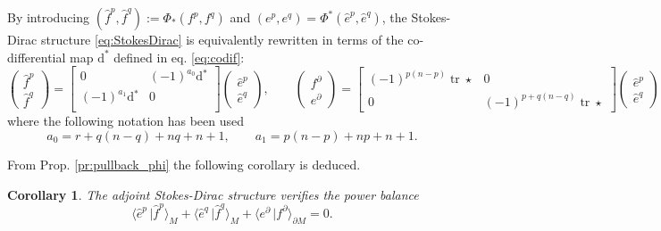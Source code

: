 \documentclass{elsarticle}
\newtheorem{corollary}{Corollary}
\renewcommand\d{\ensuremath{\mathrm{d}}}
\DeclareMathOperator{\tr}{tr}
\newcommand*{\dual}[1]{\ensuremath{\widehat{#1}}}
\newcommand{\dualpr}[3][]{\ensuremath{\langle #2 \, \vert #3 \rangle_{#1}}}
\begin{document}
By introducing $(\dual{f}^{p},\dual{f}^{q}) := \Phi_*(f^p,f^q)$ and $ (e^p,e^q)= \Phi^*(\dual{e}^{p},\dual{e}^{q})$, the Stokes-Dirac structure \eqref{eq:StokesDirac} is equivalently rewritten 
in terms of the co-differential map $\d^*$ defined in eq. \eqref{eq:codif}:
\begin{equation}\label{eq:AdjStokesDirac}
    \begin{pmatrix}
    \dual{f}^{p} \\
    \dual{f}^{q} 
    \end{pmatrix} = 
    \begin{bmatrix}
        0 &  (-1)^{a_0}\d{}^* \\
        (-1)^{a_1}\d{}^* & 0 \\
    \end{bmatrix}
    \begin{pmatrix}
        \dual{e}^{p}\\
        \dual{e}^{q}
    \end{pmatrix}, \qquad 
    \begin{pmatrix}
        {f}^\partial \\
        {e}^\partial
    \end{pmatrix} = 
    \begin{bmatrix}
    (-1)^{p(n-p)} \tr \star & 0 \\
    0 &  (-1)^{p+q(n-q)}\tr \star
    \end{bmatrix}
    \begin{pmatrix}
        \dual{e}^{p}\\
        \dual{e}^{q}
    \end{pmatrix},
\end{equation}
where the following notation has been used
\begin{equation}\label{eq:a_coeff}
    a_0 = r + q(n-q) + nq + n +1, \qquad a_1 = p(n-p) + np + n +1.
\end{equation}

From Prop. \ref{pr:pullback_phi} the following corollary is deduced.
\begin{corollary}\label{cor:pow_bal_Adj}
The adjoint Stokes-Dirac structure verifies the power balance
\begin{equation}\label{eq:pow_bal_Adj}
    \dualpr[M]{\dual{e}^p}{\dual{f}^p} + \dualpr[M]{\dual{e}^q}{\dual{f}^q} + \dualpr[\partial M]{e^\partial}{f^\partial} = 0.
\end{equation}
\end{corollary}
\end{document}
